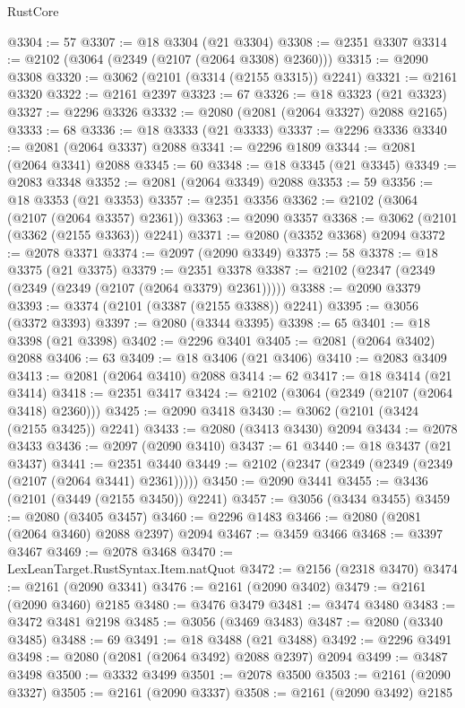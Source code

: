 \begin{lexlean}{RustCore}
\begin{coremodule}
@3304 := 57
@3307 := @18 @3304 (@21 @3304)
@3308 := @2351 @3307
@3314 := @2102 (@3064 (@2349 (@2107 (@2064 @3308) @2360)))
@3315 := @2090 @3308
@3320 := @3062 (@2101 (@3314 (@2155 @3315)) @2241)
@3321 := @2161 @3320
@3322 := @2161 @2397
@3323 := 67
@3326 := @18 @3323 (@21 @3323)
@3327 := @2296 @3326
@3332 := @2080 (@2081 (@2064 @3327) @2088 @2165)
@3333 := 68
@3336 := @18 @3333 (@21 @3333)
@3337 := @2296 @3336
@3340 := @2081 (@2064 @3337) @2088
@3341 := @2296 @1809
@3344 := @2081 (@2064 @3341) @2088
@3345 := 60
@3348 := @18 @3345 (@21 @3345)
@3349 := @2083 @3348
@3352 := @2081 (@2064 @3349) @2088
@3353 := 59
@3356 := @18 @3353 (@21 @3353)
@3357 := @2351 @3356
@3362 := @2102 (@3064 (@2107 (@2064 @3357) @2361))
@3363 := @2090 @3357
@3368 := @3062 (@2101 (@3362 (@2155 @3363)) @2241)
@3371 := @2080 (@3352 @3368) @2094
@3372 := @2078 @3371
@3374 := @2097 (@2090 @3349)
@3375 := 58
@3378 := @18 @3375 (@21 @3375)
@3379 := @2351 @3378
@3387 := @2102 (@2347 (@2349 (@2349 (@2349 (@2107 (@2064 @3379) @2361)))))
@3388 := @2090 @3379
@3393 := @3374 (@2101 (@3387 (@2155 @3388)) @2241)
@3395 := @3056 (@3372 @3393)
@3397 := @2080 (@3344 @3395)
@3398 := 65
@3401 := @18 @3398 (@21 @3398)
@3402 := @2296 @3401
@3405 := @2081 (@2064 @3402) @2088
@3406 := 63
@3409 := @18 @3406 (@21 @3406)
@3410 := @2083 @3409
@3413 := @2081 (@2064 @3410) @2088
@3414 := 62
@3417 := @18 @3414 (@21 @3414)
@3418 := @2351 @3417
@3424 := @2102 (@3064 (@2349 (@2107 (@2064 @3418) @2360)))
@3425 := @2090 @3418
@3430 := @3062 (@2101 (@3424 (@2155 @3425)) @2241)
@3433 := @2080 (@3413 @3430) @2094
@3434 := @2078 @3433
@3436 := @2097 (@2090 @3410)
@3437 := 61
@3440 := @18 @3437 (@21 @3437)
@3441 := @2351 @3440
@3449 := @2102 (@2347 (@2349 (@2349 (@2349 (@2107 (@2064 @3441) @2361)))))
@3450 := @2090 @3441
@3455 := @3436 (@2101 (@3449 (@2155 @3450)) @2241)
@3457 := @3056 (@3434 @3455)
@3459 := @2080 (@3405 @3457)
@3460 := @2296 @1483
@3466 := @2080 (@2081 (@2064 @3460) @2088 @2397) @2094
@3467 := @3459 @3466
@3468 := @3397 @3467
@3469 := @2078 @3468
@3470 := LexLeanTarget.RustSyntax.Item.natQuot
@3472 := @2156 (@2318 @3470)
@3474 := @2161 (@2090 @3341)
@3476 := @2161 (@2090 @3402)
@3479 := @2161 (@2090 @3460) @2185
@3480 := @3476 @3479
@3481 := @3474 @3480
@3483 := @3472 @3481 @2198
@3485 := @3056 (@3469 @3483)
@3487 := @2080 (@3340 @3485)
@3488 := 69
@3491 := @18 @3488 (@21 @3488)
@3492 := @2296 @3491
@3498 := @2080 (@2081 (@2064 @3492) @2088 @2397) @2094
@3499 := @3487 @3498
@3500 := @3332 @3499
@3501 := @2078 @3500
@3503 := @2161 (@2090 @3327)
@3505 := @2161 (@2090 @3337)
@3508 := @2161 (@2090 @3492) @2185

\end{coremodule}
\end{lexlean}
